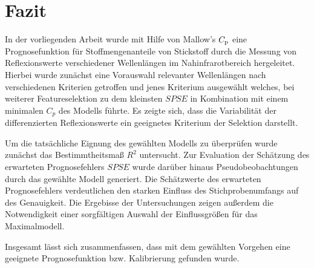 \section{Fazit}
\label{sec:Fazit}

    In der vorliegenden Arbeit wurde mit Hilfe von Mallow's $C_{\mathrm{p}}$ eine Prognosefunktion für Stoffmengenanteile von Stickstoff durch die Messung von Reflexionswerte verschiedener Wellenlängen im Nahinfrarotbereich hergeleitet.
    Hierbei wurde zunächst eine Vorauswahl relevanter Wellenlängen nach verschiedenen Kriterien getroffen und jenes Kriterium ausgewählt welches, bei weiterer Featureselektion zu dem kleinsten $SPSE$ in Kombination mit einem minimalen $C_{p}$ des Modells führte.
    Es zeigte sich, dass die Variabilität der differenzierten Reflexionswerte ein geeignetes Kriterium der Selektion darstellt.
    
    Um die tatsächliche Eignung des gewählten Modells zu überprüfen wurde zunächst das Bestimmtheitsmaß $R^2$ untersucht.
    Zur Evaluation der Schätzung des erwarteten Prognosefehlers $SPSE$ wurde darüber hinaus Pseudobeobachtungen durch das gewählte Modell generiert.
    Die Schätzwerte des erwarteten Prognosefehlers verdeutlichen den starken Einfluss des Stichprobenumfangs auf des Genauigkeit.
    Die Ergebisse der Untersuchungen zeigen außerdem die Notwendigkeit einer sorgfältigen Auswahl der Einflussgrößen für das Maximalmodell.
    
    Insgesamt lässt sich zusammenfassen, dass mit dem gewählten Vorgehen eine geeignete Prognosefunktion bzw. Kalibrierung gefunden wurde.
    
